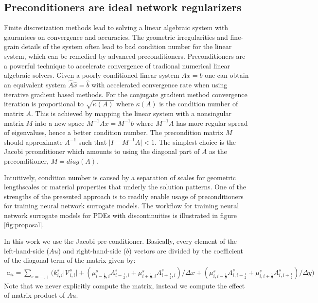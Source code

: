 \documentclass{elsarticle}
\begin{document}
\subsection{Preconditioners are ideal network regularizers}
Finite discretization methods lead to solving a linear algebraic system with gaurantees on convergence and accuracies. The geometric irregularities and fine-grain details of the system often lead to bad condition number for the linear system, which can be remedied by advanced preconditioners. Preconditioners are a powerful technique to accelerate convergence of tradional numerical linear algebraic solvers. Given a poorly conditioned linear system $Ax=b$ one can obtain an equivalent system $\hat{A}\hat{x}=\hat{b}$ with accelerated convergence rate when using iterative gradient based methods. For the conjugate gradient method convergence iteration is proportional to $\sqrt{\kappa(A)}$ where $\kappa(A)$ is the condition number of matrix $A$. This is achieved by mapping the linear system with a nonsingular matrix $M$ into a new space $M^{-1} A x = M^{-1}b$ where $M^{-1}A$ has more regular spread of eigenvalues, hence a better condition number. The precondition matrix $M$ should approximate $A^{-1}$ such that $\vert I - M^{-1}A\vert < 1$. The simplest choice is the Jacobi prconditioner which amounts to using the diagonal part of $A$ as the preconditioner, $M=diag(A)$.



Intuitively, condition number is caused by a separation of scales for geometric lengthscales or material properties that underly the solution patterns. One of the strengths of the presented approach is to readily enable usage of preconditioners for training neural network surrogate models. The workflow for training neural network surrogate models for PDEs with discontinuities is illustrated in figure \ref{fig:proposal}.

In this work we use the Jacobi pre-conditioner. Basically, every element of the left-hand-side ($A u$) and right-hand-side ($b$) vectors are divided by the coefficient of the diagonal term of the matrix given by:
\begin{align*}
a_{ii} = \sum_{s=-,+} \bigg( k_{i,i}^s \vert \mathcal{V}_{i,i}^s\vert + (\mu_{i-\frac{1}{2},i}^s A_{i-\frac{1}{2},i}^s +  \mu_{i+\frac{1}{2},i}^s A_{i+\frac{1}{2},i}^s ) / \Delta x 
+  (\mu_{i, i-\frac{1}{2}}^s A_{i, i-\frac{1}{2}}^s +  \mu_{i, i+\frac{1}{2}}^s A_{i, i+\frac{1}{2}}^s ) / \Delta y \bigg)
\end{align*}
Note that we never explicitly compute the matrix, instead we compute the effect of matrix product of $A u$.  
\end{document}
